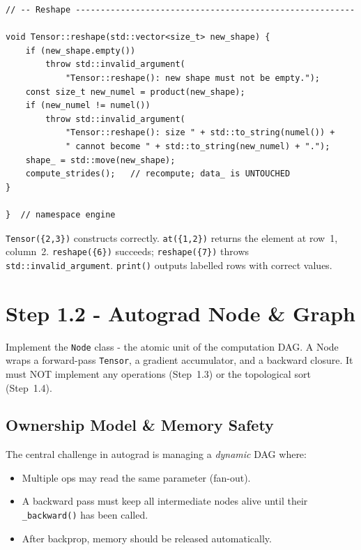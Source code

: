 \documentclass[12pt, a4paper]{article}
\begin{document}
\begin{lstlisting}[caption={\texttt{engine/tensor.cpp} - key implementation sections}]
// -- Reshape --------------------------------------------------------

void Tensor::reshape(std::vector<size_t> new_shape) {
    if (new_shape.empty())
        throw std::invalid_argument(
            "Tensor::reshape(): new shape must not be empty.");
    const size_t new_numel = product(new_shape);
    if (new_numel != numel())
        throw std::invalid_argument(
            "Tensor::reshape(): size " + std::to_string(numel()) +
            " cannot become " + std::to_string(new_numel) + ".");
    shape_ = std::move(new_shape);
    compute_strides();   // recompute; data_ is UNTOUCHED
}

}  // namespace engine
\end{lstlisting}

\begin{tcolorbox}[exitbox, title={Step 1.1 - Exit Criterion (met)}]
  \texttt{Tensor(\{2,3\})} constructs correctly.
  \texttt{at(\{1,2\})} returns the element at row~1, column~2.
  \texttt{reshape(\{6\})} succeeds; \texttt{reshape(\{7\})} throws
  \texttt{std::invalid\_argument}.
  \texttt{print()} outputs labelled rows with correct values.
\end{tcolorbox}

\newpage
\section{Step 1.2 - Autograd Node \& Graph}

\begin{tcolorbox}[designbox, title={Step 1.2 Goal}]
  Implement the \texttt{Node} class - the atomic unit of the computation DAG.
  A Node wraps a forward-pass \texttt{Tensor}, a gradient accumulator, and a
  backward closure.  It must NOT implement any operations (Step~1.3) or the
  topological sort (Step~1.4).
\end{tcolorbox}

\subsection{Ownership Model \& Memory Safety}

The central challenge in autograd is managing a \emph{dynamic} DAG where:
\begin{itemize}
  \item Multiple ops may read the same parameter (fan-out).
  \item A backward pass must keep all intermediate nodes alive until their
        \texttt{\_backward()} has been called.
  \item After backprop, memory should be released automatically.
\end{itemize}
\end{document}
